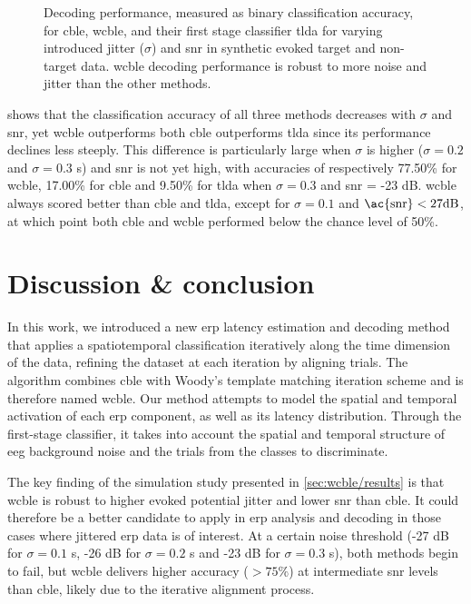 \begin{figure}
  \sffamily\sansmath
  
  \caption[Synthetic decoding results]{Decoding performance, measured as binary
  classification accuracy, for \ac{cble}, \ac{wcble}, and their first stage
  classifier \ac{tlda} for varying introduced jitter ($\sigma$) and \ac{snr} in
  synthetic evoked target and non-target data.
  \Ac{wcble} decoding performance is robust to more noise and jitter than the other methods.}
  \label{fig:wcble/results/accuracy}
\end{figure}

 shows that the classification accuracy of all
three methods decreases with $\sigma$ and \ac{snr}, yet \ac{wcble} outperforms
both \ac{cble} outperforms \ac{tlda} since its performance declines less steeply.
This difference is particularly large when $\sigma$ is higher
($\sigma=0.2$ and $\sigma=0.3$ s) and \ac{snr} is not yet high, with accuracies of respectively
77.50\% for \ac{wcble}, 17.00\% for \ac{cble} and 9.50\% for \ac{tlda} when
$\sigma=0.3$ and \ac{snr} = -23 dB.
\Ac{wcble} always scored better than \ac{cble} and \ac{tlda}, except for
$\sigma=0.1$ and $\text{\ac{snr}} < 27 \text{dB}$, at which point both \ac{cble}
and \ac{wcble} performed below the chance level of 50\%.

\section{Discussion \& conclusion}
\label{sec:wcble/conclusion}

In this work, we introduced a new \ac{erp} latency estimation and decoding
method that applies a spatiotemporal classification iteratively along the time
dimension of the data, refining the dataset at each iteration by aligning
trials.
The algorithm combines \acf{cble} with Woody's template matching iteration
scheme and is therefore named \acf{wcble}.
Our method attempts to model the spatial and temporal activation of
each \ac{erp} component, as well as its latency distribution.
Through the first-stage classifier, it takes into account the
spatial and temporal structure of \ac{eeg} background noise and the trials from the
classes to discriminate.

The key finding of the simulation study presented
in \cref{sec:wcble/results} is that \ac{wcble} is robust to higher evoked
potential jitter and lower \ac{snr} than \ac{cble}.
It could therefore be a better candidate to apply in \ac{erp} analysis and
decoding in those cases where jittered \ac{erp} data is of interest.
At a certain noise threshold (-27 dB for $\sigma=0.1$ s, -26 dB for
$\sigma=0.2$ s and -23 dB for $\sigma=0.3$ s), both methods begin to fail, but \ac{wcble}
delivers higher accuracy ($>75\%$) at intermediate \ac{snr} levels than
\ac{cble}, likely due to the iterative alignment process.

